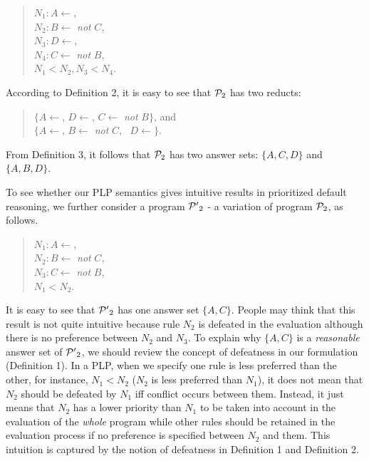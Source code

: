 \documentclass{tlp}
\begin{document}
\begin{quote}
$N_{1}: A\leftarrow$,\\
\hspace*{.1in} $N_{2}: B\leftarrow$ {\em not} $C$,\\
\hspace*{.1in} $N_{3}: D\leftarrow$,\\
\hspace*{.1in} $N_{4}: C\leftarrow$ {\em not} $B$,\\
\hspace*{.1in} $N_{1}<N_{2}, N_{3}<N_{4}$.
\end{quote}

According to Definition 2, it is easy to see that
${\cal P}_{2}$ has two reducts:
\begin{quote}
$\{A\leftarrow$, \hspace*{.05in}
$D\leftarrow$, 
\hspace*{.05in} $C\leftarrow$ {\em not} $B\}$, and\\
\hspace*{.1in}  $\{A\leftarrow$, 
\hspace*{.05in} $B\leftarrow$ {\em not} $C$,\
\hspace*{.05in} $D\leftarrow\}$.
\end{quote}
%
From Definition 3, it follows that ${\cal P}_{2}$ has two answer sets:
$\{A,C,D\}$ and $\{A,B,D\}$.

To see whether our PLP semantics gives intuitive results in
prioritized default reasoning, we further consider a program
${\cal P'}_2$ - a variation of program ${\cal P}_2$, as follows.
\begin{quote}
$N_1: A\leftarrow$,\\
\hspace*{.1in} $N_2: B\leftarrow$ {\em not} $C$, \\
\hspace*{.1in} $N_3: C\leftarrow$ {\em not} $B$,\\
\hspace*{.1in} $N_1<N_2$.
\end{quote}
It is easy to see that ${\cal P'}_2$ has one answer set $\{A, C\}$.
People may think that this result is not quite intuitive because 
rule $N_2$ is defeated in the evaluation although there is no
preference between $N_2$ and $N_3$. To explain why 
$\{A, C\}$ is a {\em reasonable} answer set of ${\cal P'}_2$, we should
review the concept of defeatness in our formulation (Definition 1).
In a PLP, when we specify one rule is less preferred than the other, for instance,
$N_1<N_2$ ($N_2$ is less preferred than $N_1$), it does not mean
that $N_2$ should be defeated by $N_1$ iff conflict occurs between them. 
Instead, it just means that $N_2$ has a lower priority than $N_1$
to be taken into account in the evaluation of
the {\em whole} program while other rules should be retained in 
the evaluation process if no preference is specified between 
$N_2$ and them. This intuition is captured by
the notion of defeatness in Definition 1 and Definition 2. 
\end{document}
